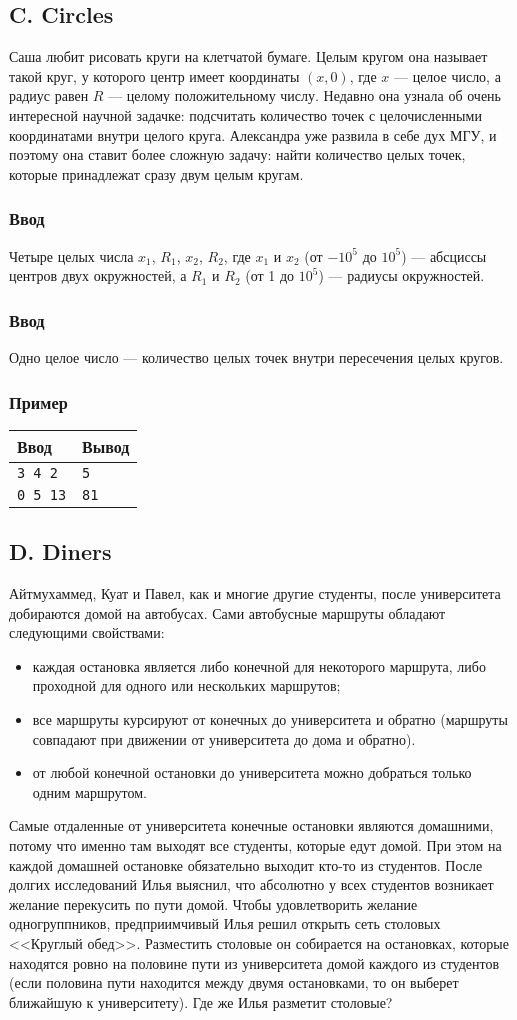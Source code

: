 \documentclass[10pt, a4paper]{article}
\newcommand{\informat}[1]
{
	\subsubsection*{Ввод} #1
}
\newcommand{\examplee}[4]
{
	\subsubsection*{Пример}
	\noindent
	\begin{center}
	\begin{tabularx}{\linewidth}{|X|X|}
	\hline
	Ввод 	& Вывод  	\\
	\hline
	{\tt #1} & {\tt #2}	\\
	\hline
	{\tt #3} & {\tt #4}	\\
	\hline
	\end{tabularx}
	\end{center}
}
\begin{document}
\subsection*{C. Circles}

Саша любит рисовать круги на клетчатой бумаге. Целым кругом она называет такой круг, у которого центр имеет координаты $(x, 0)$, где $x$ --- целое число, а радиус равен $R$ --- целому положительному числу. Недавно она узнала об очень интересной научной задачке: подсчитать количество точек с целочисленными координатами внутри целого круга. Александра уже развила в себе дух МГУ, и поэтому она ставит более сложную задачу: найти количество целых точек, которые принадлежат сразу двум целым кругам.

\informat{Четыре целых числа $x_1$, $R_1$, $x_2$, $R_2$, где $x_1$ и $x_2$ (от $-10^5$ до $10^5$) --- абсциссы центров двух окружностей, а $R_1$ и $R_2$ (от 1 до $10^5$) --- радиусы окружностей.}
 
\informat{Одно целое число --- количество целых точек внутри пересечения целых кругов.}
 
\examplee{3 4 \newline -1 2}{5}{0 5 \newline 0 13}{81}
  
\subsection*{D. Diners}

Айтмухаммед, Куат и Павел, как и многие другие студенты, после университета добираются домой на автобусах. Сами автобусные маршруты обладают следующими свойствами: 
\begin{itemize}
\item каждая остановка является либо конечной для некоторого маршрута, либо проходной для одного или нескольких маршрутов;
\item все маршруты курсируют от конечных до университета и обратно (маршруты совпадают при движении от университета до дома и обратно).
\item от любой конечной остановки до университета можно добраться только одним маршрутом.
\end{itemize}
Самые отдаленные от университета конечные остановки являются домашними, потому что именно там выходят все студенты, которые едут домой. При этом на каждой домашней остановке обязательно выходит кто-то из студентов. После долгих исследований Илья выяснил, что абсолютно у всех студентов возникает желание перекусить по пути домой. Чтобы удовлетворить желание одногруппников, предприимчивый Илья решил открыть сеть столовых <<Круглый обед>>. Разместить столовые он собирается на остановках, которые находятся ровно на половине пути из университета домой каждого из студентов (если половина пути находится между двумя остановками, то он выберет ближайшую к университету). Где же Илья разметит столовые?
 
\end{document}
